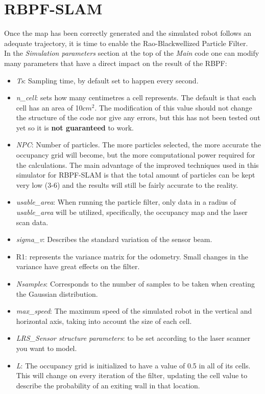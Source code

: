 \section{RBPF-SLAM}
Once the map has been correctly generated and the simulated robot follows an adequate trajectory, it is time to enable the Rao-Blackwellized Particle Filter.\\
In the \textit{Simulation parameters} section at the top of the \textit{Main} code one can modify many parameters that have a direct impact on the result of the RBPF:

\begin{itemize}
	\item \textit{Ts}: Sampling time, by default set to happen every second.
	\item \textit{n\_cell}: sets how many centimetres a cell represents. The default is that each cell has an area of 10$cm^2$. The modification of this value should not change the structure of the code nor give any errors, but this has not been tested out yet so it is \textbf{not guaranteed} to work.
	\item \textit{NPC}: Number of particles. The more particles selected, the more accurate the occupancy grid will become, but the more computational power required for the calculations. The main advantage of the improved techniques used in this simulator for RBPF-SLAM is that the total amount of particles can be kept very low (3-6) and the results will still be fairly accurate to the reality.
	\item \textit{usable\_area}: When running the particle filter, only data in a radius of \textit{usable\_area} will be utilized, specifically, the occupancy map and the laser scan data. 
	\item \textit{sigma\_v}: Describes the standard variation of the sensor beam.
	\item R1: represents the variance matrix for the odometry. Small changes in the variance have great effects on the filter.
	\item \textit{Nsamples}: Corresponds to the number of samples to be taken when creating the Gaussian distribution. 
	\item \textit{max\_speed}: The maximum speed of the simulated robot in the vertical and horizontal axis, taking into account the size of each cell.
	\item \textit{LRS\_Sensor structure parameters}: to be set according to the laser scanner you want to model.
	\item \textit{L}: The occupancy grid is initialized to have a value of 0.5 in all of its cells. This will change on every iteration of the filter, updating the cell value to describe the probability of an exiting wall in that location.
\end{itemize}

